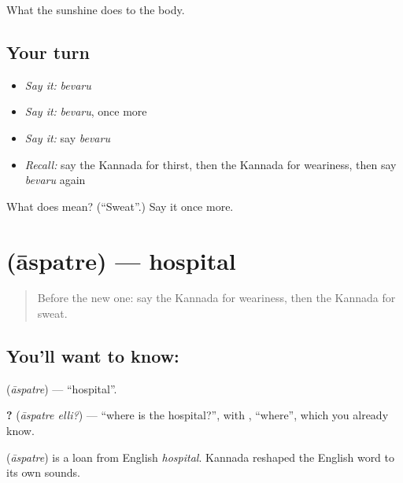 \begin{grammarlens}[title={What you've built}]
What the sunshine does to the body.
\end{grammarlens}

\subsection*{Your turn}
\begin{itemize}
\raggedright
  \item \emph{Say it:} \emph{bevaru}
  \item \emph{Say it:} \emph{bevaru}, once more
  \item \emph{Say it:} say \emph{bevaru}
  \item \emph{Recall:} say the Kannada for thirst, then the Kannada for weariness, then say \emph{bevaru} again
\end{itemize}

\begin{tcolorbox}[breakable,colback=teal!4,colframe=teal!35!black,title={Before you move on}]
What does  mean? (\textquotedblleft{}Sweat\textquotedblright{}.) Say it once more.
\end{tcolorbox}
\section[\texorpdfstring{\kn{ಆಸ್ಪತ್ರೆ} (āspatre)}{ಆಸ್ಪತ್ರೆ (āspatre)}]{ (āspatre) — hospital}

\label{lesson:KA-C84-hospital}



\begin{quote}
Before the new one: say the Kannada for weariness, then the Kannada for sweat.
\end{quote}

\subsection*{You'll want to know: }
\textbf{} (\emph{āspatre}) — \textquotedblleft{}hospital\textquotedblright{}.

\textbf{ ?} (\emph{āspatre elli?}) — \textquotedblleft{}where is the hospital?\textquotedblright{}, with \textbf{}, \textquotedblleft{}where\textquotedblright{}, which you already know.

\begin{cousinweb}
\textbf{} (\emph{āspatre}) is a loan from English \emph{hospital}. Kannada reshaped the English word to its own sounds.
\end{cousinweb}

